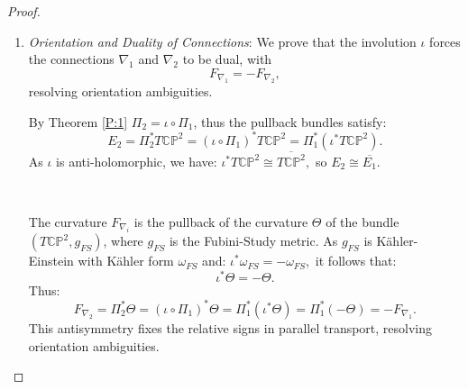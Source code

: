 \documentclass[10pt,a4paper]{amsart}
\begin{document}
\begin{proof}
\begin{enumerate}
    \item {\it Orientation and Duality of Connections}:
We prove that the involution $\iota$ forces the connections $\nabla_1$ and $\nabla_2$ to be dual, with 
\[
F_{\nabla_1} = -F_{\nabla_2},
\]
resolving orientation ambiguities.

By Theorem \ref{P:1} $\Pi_2 = \iota \circ \Pi_1$, thus the pullback bundles satisfy:
\[
E_2 = \Pi_2^* T \mathbb{CP}^2 = (\iota \circ \Pi_1)^* T \mathbb{CP}^2 = \Pi_1^* \left( \iota^* T \mathbb{CP}^2 \right).
\]
As $\iota$ is anti-holomorphic, we have:
$
\iota^* T \mathbb{CP}^2 \cong \overline{T \mathbb{CP}^2},$
so $E_2 \cong \overline{E_1}.$

\, 

The curvature $F_{\nabla_i}$ is the pullback of the curvature $\Theta$ of the bundle $\left( T \mathbb{CP}^2, g_{FS} \right)$, where $g_{FS}$ is the Fubini-Study metric. As $g_{FS}$ is Kähler-Einstein with Kähler form $\omega_{FS}$ and:
$\iota^* \omega_{FS} = -\omega_{FS},$
it follows that:
\[
\iota^* \Theta = -\Theta.
\]
Thus:
\[
F_{\nabla_2} = \Pi_2^* \Theta = (\iota \circ \Pi_1)^* \Theta = \Pi_1^* \left( \iota^* \Theta \right) = \Pi_1^* ( -\Theta ) = - F_{\nabla_1}.
\]
This antisymmetry fixes the relative signs in parallel transport, resolving orientation ambiguities.


\end{enumerate}
\end{proof}
\end{document}
